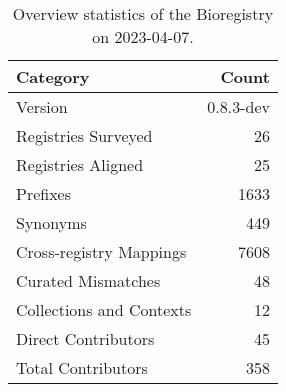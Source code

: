\begin{table}
\caption{Overview statistics of the Bioregistry on 2023-04-07.}
\label{tab:bioregistry-summary}
\begin{tabular}{lr}
\toprule
Category & Count \\
\midrule
Version & 0.8.3-dev \\
Registries Surveyed & 26 \\
Registries Aligned & 25 \\
Prefixes & 1633 \\
Synonyms & 449 \\
Cross-registry Mappings & 7608 \\
Curated Mismatches & 48 \\
Collections and Contexts & 12 \\
Direct Contributors & 45 \\
Total Contributors & 358 \\
\bottomrule
\end{tabular}
\end{table}
